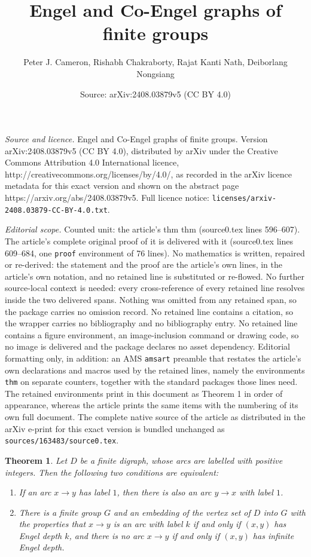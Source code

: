 \documentclass[10pt,a4paper]{amsart}
\title{Engel and Co-Engel graphs of finite groups}
\author{Peter J. Cameron, Rishabh Chakraborty, Rajat Kanti Nath, Deiborlang Nongsiang}
\date{Source: arXiv:2408.03879v5 (CC BY 4.0)}
\newtheorem{thm}{Theorem}
\begin{document}
\maketitle

\noindent\emph{Source and licence.} Engel and Co-Engel graphs of finite groups. Version arXiv:2408.03879v5 (CC BY 4.0), distributed by arXiv under the Creative Commons Attribution 4.0 International licence, http://creativecommons.org/licenses/by/4.0/, as recorded in the arXiv licence metadata for this exact version and shown on the abstract page https://arxiv.org/abs/2408.03879v5. Full licence notice: \texttt{licenses/arxiv-2408.03879-CC-BY-4.0.txt}.\par\smallskip

\noindent\textit{Editorial scope.} Counted unit: the article's thm thm (source0.tex lines 596--607). The article's complete original proof of it is delivered with it (source0.tex lines 609--684, one \texttt{proof} environment of 76 lines). No mathematics is written, repaired or re-derived: the statement and the proof are the article's own lines, in the article's own notation, and no retained line is substituted or re-flowed.  No further source-local context is needed: every cross-reference of every retained line resolves inside the two delivered spans.  Nothing was omitted from any retained span, so the package carries no omission record.  No retained line contains a citation, so the wrapper carries no bibliography and no bibliography entry.  No retained line contains a figure environment, an image-inclusion command or drawing code, so no image is delivered and the package declares no asset dependency.  Editorial formatting only, in addition: an AMS \texttt{amsart} preamble that restates the article's own declarations and macros used by the retained lines, namely the environments \texttt{thm} on separate counters, together with the standard packages those lines need.  The retained environments print in this document as Theorem 1 in order of appearance, whereas the article prints the same items with the numbering of its own full document.  The complete native source of the article as distributed in the arXiv e-print for this exact version is bundled unchanged as \texttt{sources/163483/source0.tex}.
\begin{thm}
Let $D$ be a finite digraph, whose arcs are labelled with positive integers.
Then the following two conditions are equivalent:
\begin{enumerate}
\item If an arc $x\to y$ has label $1$, then there is also an arc $y\to x$
with label $1$.
\item There is a finite group $G$ and an embedding of the vertex set of
$D$ into $G$ with the properties that $x\to y$ is an arc with label $k$ if
and only if $(x,y)$ has Engel depth $k$, and there is no arc $x\to y$ if and
only if $(x,y)$ has infinite Engel depth.
\end{enumerate}
\end{thm}
\end{document}
